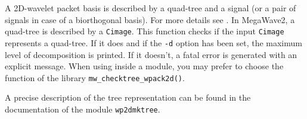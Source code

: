 A 2D-wavelet packet basis is described by a quad-tree and a signal (or a pair
of signals in case of a biorthogonal basis). 
For more details see \cite{mallat:wavelet}. In MegaWave2, a
quad-tree is described by a \verb+Cimage+. 
This function checks if the input \verb+Cimage+ represents a quad-tree.
If it does and if the \verb+-d+ option has been set, the maximum level of 
decomposition is printed.
If it doesn't, a fatal error is generated with an explicit message.
When using inside a module, you may prefer to choose the function of the library
\verb+mw_checktree_wpack2d()+.

A precise description of the tree representation can be
found in the documentation of the module \verb+wp2dmktree+.
